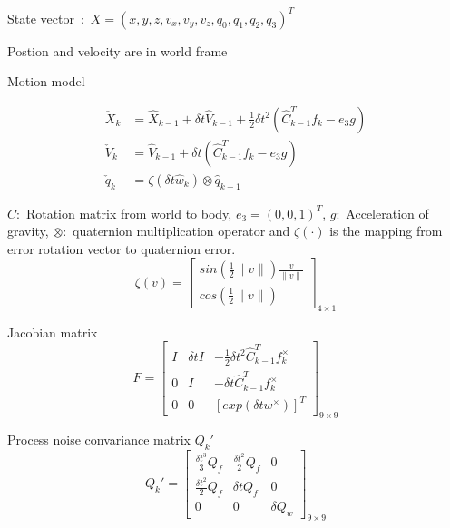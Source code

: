 \documentclass{cisXXX} %
\begin{document}
\maketitle


\newpage

State vector~:~$X=(x,y,z,v_x,v_y,v_z,q_0,q_1,q_2,q_3)^T$

Postion and velocity are in world frame

Motion model

\begin{equation}
\begin{split}
\check{X}_k &= \hat{X}_{k-1}+\delta t\hat{V}_{k-1}+\frac{1}{2}\delta t^2\left(\hat{C}_{k-1}^T f_k-e_3g\right) \\
\check{V}_k &= \hat{V}_{k-1}+\delta t\left(\hat{C}_{k-1}^T f_k-e_3 g\right) \\
\check{q}_k &= \zeta\left(\delta t \hat{w}_k\right)\otimes \hat{q}_{k-1}
\end{split}
\end{equation}


 $C:$ Rotation matrix from world to body, $e_3=(0,0,1)^T$, $g:$ Acceleration of gravity, $\otimes:$ quaternion multiplication operator and $\zeta(\cdot)$ is the mapping from error rotation vector to quaternion error.
\begin{equation}
\renewcommand\arraystretch{1.7}
 \zeta(v)=\begin{bmatrix}
  sin\left(\frac{1}{2}\|v\|\right)\frac{v}{\|v\|}  \\
  cos\left(\frac{1}{2}\|v\|\right)
 \end{bmatrix}_{4\times 1} 
\end{equation} 

Jacobian matrix
\begin{equation}
\renewcommand\arraystretch{1.7}
F=\begin{bmatrix}
 I   & \delta tI & -\frac{1}{2} \delta t^2 \hat{C}_{k-1}^T f_k^{\times}   \\
 0   & I         & -\delta t \hat{C}_{k-1}^T f_k^{\times}   \\
 0   & 0         & [exp(\delta t w^{\times})]^T
\end{bmatrix}_{9\times 9}
\end{equation}

Process noise convariance matrix $Q_k'$
\begin{equation}
\renewcommand\arraystretch{1.7}
Q_k' = \begin{bmatrix}
\frac{\delta t^3}{3} Q_f    & \frac{\delta t^2}{2} Q_f  &0 \\
\frac{\delta t^2}{2} Q_f    & \delta t Q_f              &0 \\
0                           &  0                   & \delta Q_w    
\end{bmatrix}_{9\times 9}
\end{equation}
\end{document}
